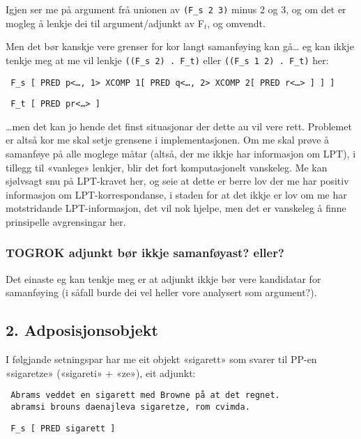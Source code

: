 \documentclass[11pt,a4paper,oneside,draft]{book}
\begin{document}
Igjen ser me på argument frå unionen av \texttt{(F\_s 2 3)} minus 2 og 3, og
om det er mogleg å lenkje dei til argument/adjunkt av F$_t$, og omvendt.

Men det bør kanskje vere grenser for kor langt samanføying kan gå… eg
kan ikkje tenkje meg at me vil lenkje \texttt{((F\_s 2) . F\_t)} eller \texttt{((F\_s 1 2) . F\_t)} her:

\begin{verbatim}
 F_s [ PRED p<…, 1> XCOMP 1[ PRED q<…, 2> XCOMP 2[ PRED r<…> ] ] ]
\end{verbatim}


\begin{verbatim}
 F_t [ PRED pr<…> ]
\end{verbatim}


\ldots{}men det kan jo hende det finst situasjonar der dette au vil vere
rett. Problemet er altså kor me skal setje grensene i
implementasjonen. Om me skal prøve å samanføye på alle moglege måtar
(altså, der me ikkje har informasjon om LPT), i tillegg til «vanlege»
lenkjer, blir det fort komputasjonelt vanskeleg. Me kan sjølvsagt snu
på LPT-kravet her, og seie at dette er berre lov der me har positiv
informasjon om LPT-korrespondanse, i staden for at det ikkje er lov om
me har motstridande LPT-informasjon, det vil nok hjelpe, men det er
vanskeleg å finne prinsipelle avgrensingar her. 
\subsubsection{\textbf{TOGROK} adjunkt bør ikkje samanføyast? eller?}
\label{sec-3.8.1.1}

Det einaste eg kan
tenkje meg er at adjunkt ikkje bør vere kandidatar for samanføying (i
såfall burde dei vel heller vore analysert som argument?).

\subsection{2. Adposisjonsobjekt}
\label{sec-3.8.2}


I følgjande setningspar har me eit objekt «sigarett» som svarer til
PP-en «sigaretze» («sigareti» + «ze»), eit adjunkt:

\begin{verbatim}
 Abrams veddet en sigarett med Browne på at det regnet.
 abramsi brouns daenajleva sigaretze, rom cvimda.
\end{verbatim}


\begin{verbatim}
 F_s [ PRED sigarett ]
\end{verbatim}
\end{document}
